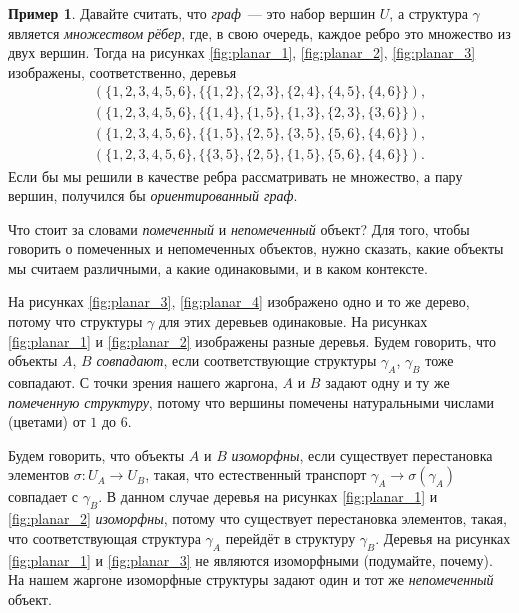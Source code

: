 \documentclass{article}
\theoremstyle{definition}
\newtheorem{example}{Пример}
\begin{document}
\begin{example}
Давайте считать, что \textit{граф}~--- это набор вершин \( U \), а структура \( 
\gamma \) является \textit{множеством} \textit{рёбер}, где, в свою очередь, 
каждое ребро это множество из двух вершин. Тогда на рисунках 
\ref{fig:planar_1}, \ref{fig:planar_2}, \ref{fig:planar_3} изображены, 
соответственно, деревья
\begin{eqnarray*}
	(\{1,2,3,4,5,6\}, \{ \{1,2\}, \{2,3\}, \{2,4\}, \{4,5\}, \{4,6\} \}), \\
	(\{1,2,3,4,5,6\}, \{ \{1,4\}, \{1,5\}, \{1,3\}, \{2,3\}, \{3,6\} \}), \\
	(\{1,2,3,4,5,6\}, \{ \{1,5\}, \{2,5\}, \{3,5\}, \{5,6\}, \{4,6\} \}), \\
	(\{1,2,3,4,5,6\}, \{ \{3,5\}, \{2,5\}, \{1,5\}, \{5,6\}, \{4,6\} \}).
\end{eqnarray*}
Если бы мы решили в качестве ребра рассматривать не множество, а пару вершин, 
получился бы \textit{ориентированный граф}.
\end{example}

Что стоит за словами \textit{помеченный} и \textit{непомеченный} объект? Для 
того, чтобы говорить о помеченных и непомеченных объектов, нужно сказать, какие 
объекты мы считаем различными, а какие одинаковыми, и в каком контексте.

На рисунках \ref{fig:planar_3}, \ref{fig:planar_4} изображено одно и то же 
дерево, потому что структуры \( \gamma \) для этих деревьев одинаковые. На 
рисунках 
\ref{fig:planar_1} и \ref{fig:planar_2} изображены разные деревья. Будем 
говорить, что объекты \( A \), \( B \) \textit{совпадают}, если соответствующие 
структуры \( \gamma_A \), \( \gamma_B \) тоже совпадают. С точки зрения нашего 
жаргона, 
\( A \) и \( B \) задают одну и ту же \textit{помеченную структуру}, потому что 
вершины помечены натуральными числами (цветами) от \( 1 \) до \( 6 \).

Будем говорить, что объекты \( A \) и \( B \) \textit{изоморфны}, если 
существует перестановка элементов \( \sigma \colon U_A \to U_B \), такая, что 
естественный транспорт \( \gamma_A \to \sigma(\gamma_A) \) совпадает с \( 
\gamma_B \). В данном случае деревья на рисунках \ref{fig:planar_1} и 
\ref{fig:planar_2} \textit{изоморфны}, потому что существует перестановка 
элементов, такая, что соответствующая структура \( \gamma_A \) перейдёт в 
структуру \( \gamma_B \). Деревья на рисунках \ref{fig:planar_1} и 
\ref{fig:planar_3} не являются изоморфными (подумайте, почему). На нашем 
жаргоне изоморфные структуры задают один и тот же \textit{непомеченный} объект.
\end{document}
